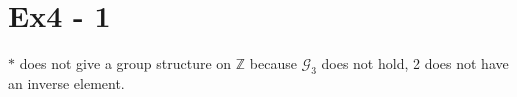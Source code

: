 \section*{Ex4 - 1}
$ * $ does not give a group structure on $ \mathbb{Z} $ because $ \mathscr{G}_3 $ does not hold, 2 does not have an inverse element. 